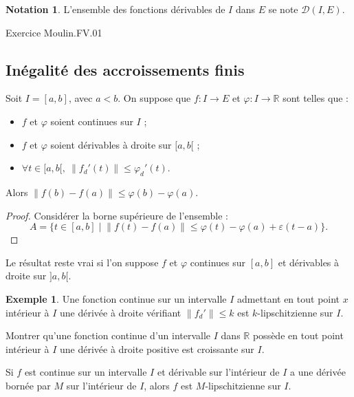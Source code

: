 \documentclass[french]{article}
\newcommand{\R}{\mathbb{R}}
\theoremstyle{plain}
\theoremstyle{definition}
\newtheorem*{ex}{Exemple}
\newtheorem*{notation}{Notation}
\theoremstyle{remark}
\begin{document}
\begin{notation}
	L'ensemble des fonctions dérivables de $I$ dans $E$ se note $\mathcal{D}(I,E)$.
\end{notation}

Exercice Moulin.FV.01

\subsection{Inégalité des accroissements finis}

\begin{thm}%
	Soit $I=[a,b]$, avec $a<b$. On suppose que $f:I\to E$ et $\varphi:I\to\R$ sont telles que :
	\begin{itemize}
		\item $f$ et $\varphi$ soient continues sur $I$ ;
		\item $f$ et $\varphi$ soient dérivables à droite sur $[a,b[$ ;
		\item $\forall t\in[a,b[,\ \lVert f_d'(t)\rVert\leqslant\varphi_d'(t)$.
	\end{itemize}
	Alors $\lVert f(b)-f(a)\rVert\leqslant\varphi(b)-\varphi(a)$.
\end{thm}
\begin{proof}
	Considérer la borne supérieure de l'ensemble :
	$$A=\{t\in[a,b]\mid \lVert f(t)-f(a)\rVert\leqslant\varphi(t)-\varphi(a)+\varepsilon(t-a)\}.$$
\end{proof}

\begin{cor}%
	Le résultat reste vrai si l'on suppose $f$ et $\varphi$ continues sur $[a,b]$ et dérivables à droite sur $]a,b[$. %
\end{cor}

\begin{ex}
	Une fonction continue sur un intervalle $I$ admettant en tout point $x$ intérieur à $I$ une dérivée à droite vérifiant $\lVert f_d'\rVert\leqslant k$ est $k$-lipschitzienne sur $I$.
\end{ex}

\begin{exo}
	Montrer qu'une fonction continue d'un intervalle $I$ dans $\R$ possède en tout point intérieur à $I$ une dérivée à droite positive est croissante sur $I$.
\end{exo}

\begin{cor}%
	Si $f$ est continue sur un intervalle $I$ et dérivable sur l'intérieur de $I$ a une dérivée bornée par $M$ sur l'intérieur de $I$, alors $f$ est $M$-lipschitzienne sur $I$.
\end{cor}
\end{document}
